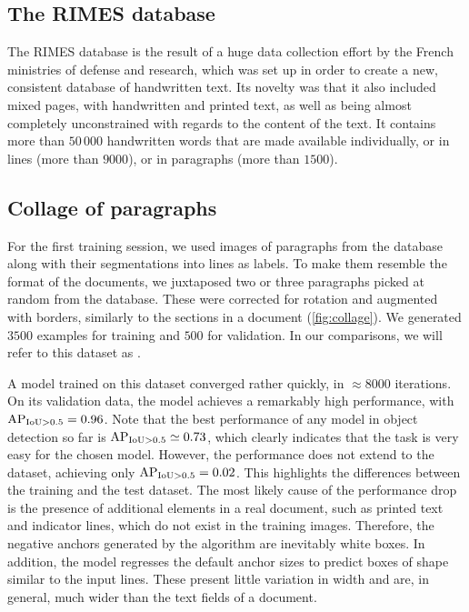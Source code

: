 
	\subsection{The RIMES database}\label{sec:rimes}
		The RIMES database \citep{rimes} is the result of a huge data collection effort by the French ministries of defense and research, which was set up in order to create a new, consistent database of handwritten text. Its novelty was that it also included mixed pages, with handwritten and printed text, as well as being almost completely unconstrained with regards to the content of the text.	It contains more than \(50\,000\) handwritten words that are made available individually, or in lines (more than \(9000\)), or in paragraphs (more than \(1500\)).


	\subsection{Collage of paragraphs}
		For the first training session, we used images of paragraphs from the database along with their segmentations into lines as labels. To make them resemble the format of the documents, we juxtaposed two or three paragraphs picked at random from the database. These were corrected for rotation and augmented with borders, similarly to the sections in a document (\autoref{fig:collage}). We generated \(3500\) examples for training and \(500\) for validation. In our comparisons, we will refer to this dataset as .

		A model trained on this dataset converged rather quickly, in \(\approx 8000\) iterations. On its validation data, the model achieves a remarkably high performance, with \mbox{\(\operatorname{\operatorname{AP}_{\operatorname{IoU} > 0.5}} = 0.96\)}. Note that the best performance of any model in object detection so far is \(\operatorname{\operatorname{AP}_{\operatorname{IoU} > 0.5}} \simeq 0.73\), which clearly indicates that the task is very easy for the chosen model. However, the performance does not extend to the  dataset, achieving only \(\operatorname{\operatorname{AP}_{\operatorname{IoU} > 0.5}} = 0.02\). This highlights the differences between the training and the test dataset. The most likely cause of the performance drop is the presence of additional elements in a real document, such as printed text and indicator lines, which do not exist in the training images. Therefore, the negative anchors generated by the algorithm are inevitably white boxes. In addition, the model regresses the default anchor sizes to predict boxes of shape similar to the input lines. These present little variation in width and are, in general, much wider than the text fields of a document.

